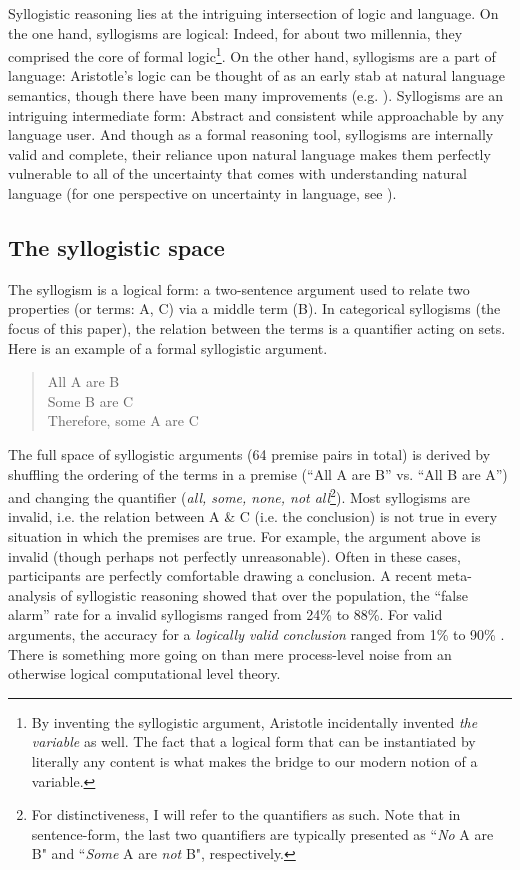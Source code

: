\documentclass{llncs} %
\begin{document}
Syllogistic reasoning lies at the intriguing intersection of logic and language. On the one hand, syllogisms are logical: Indeed, for about two millennia, they comprised the core of formal logic\footnote{By inventing the syllogistic argument, Aristotle incidentally invented \emph{the variable} as well. The fact that a logical form that can be instantiated by literally any content is what makes the bridge to our modern notion of a variable.}. On the other hand, syllogisms are a part of language: Aristotle's logic can be thought of as an early stab at natural language semantics, though there have been many improvements (e.g. \cite{Horn1989}). Syllogisms are an intriguing intermediate form: Abstract and consistent while approachable by any language user. And though as a formal reasoning tool, syllogisms are internally valid and complete, their reliance upon natural language makes them perfectly vulnerable to all of the uncertainty that comes with understanding natural language (for one perspective on uncertainty in language, see \cite{GoodLass2015}).

\subsection{The syllogistic space}

The syllogism is a logical form: a two-sentence argument used to relate two properties (or terms: A, C) via a middle term (B). In categorical syllogisms (the focus of this paper), the relation between the terms is a quantifier acting on sets. Here is an example of a formal syllogistic argument.
\begin{quote}
All A are B\\
Some B are C\\
Therefore, some A are C
\end{quote}
The full space of syllogistic arguments (64 premise pairs in total) is derived by shuffling the ordering of the terms in a premise (``All A are B'' vs. ``All B are A'') and changing the quantifier (\emph{all, some, none, not all}\footnote{For distinctiveness, I will refer to the quantifiers as such. Note that in sentence-form, the last two quantifiers are typically presented as ``\emph{No} A are B" and ``\emph{Some} A are \emph{not} B", respectively.}). Most syllogisms are invalid, i.e. the relation between A \& C (i.e. the conclusion) is not true in every situation in which the premises are true. For example, the argument above is invalid (though perhaps not perfectly unreasonable). Often in these cases, participants are perfectly comfortable drawing a conclusion. A recent meta-analysis of syllogistic reasoning showed that over the population, the ``false alarm'' rate for a invalid syllogisms ranged from 24\% to 88\%. For valid arguments, the accuracy for a \emph{logically valid conclusion} ranged from 1\% to 90\% \cite{Khemlani2012}. There is something more going on than mere process-level noise from an otherwise logical computational level theory.
\end{document}
